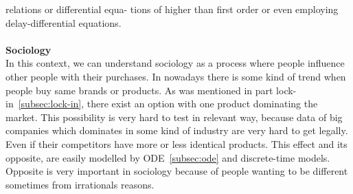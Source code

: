 relations or differential equa- tions of higher than first order or even employing delay-differential equations.\\
\\
\textbf{Sociology} \label{subsec:sociology}\\
In this context, we can understand sociology as a process where people influence other people with their purchases.
In nowadays there is some kind of trend when people buy same brands or products. As was mentioned in part lock-in~\ref{subsec:lock-in},
there exist an option with one product dominating the market.
This possibility is very hard to test in relevant way, because data of big  companies which dominates in some kind of industry are very hard to get legally.
Even if their competitors have more or less identical products.
This effect and its opposite, are easily modelled by ODE~\ref{subsec:ode} and discrete-time models.
Opposite is very important in sociology because of people wanting to be different sometimes from irrationals reasons.

